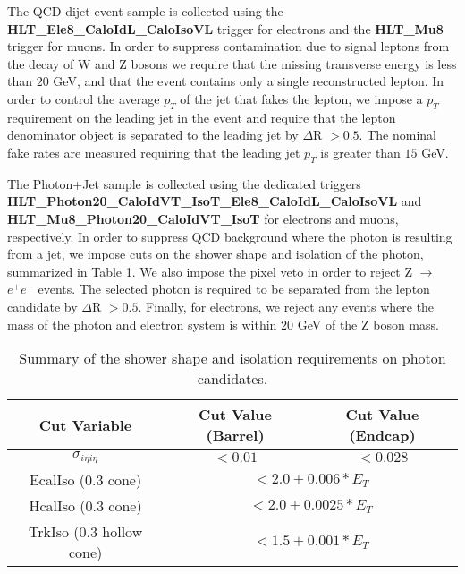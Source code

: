 The QCD dijet event sample is collected using the {\bf HLT\_Ele8\_CaloIdL\_CaloIsoVL } 
trigger for electrons and the {\bf HLT\_Mu8 } trigger for muons. In order to suppress 
contamination due to signal leptons from the decay of W and Z bosons we require
that the missing transverse energy is less than $20$ GeV, and that the event contains 
only a single reconstructed lepton. In order to control the average $p_{T}$ of the
jet that fakes the lepton, we impose a $p_{T}$ requirement on the leading jet
in the event and require that the lepton denominator object is 
separated to the leading jet by $\Delta$R $ > 0.5$. The nominal fake rates are measured
requiring that the leading jet $p_{T}$ is greater than $15$ GeV. 

The Photon+Jet sample is collected using the dedicated triggers \\
{\bf HLT\_Photon20\_CaloIdVT\_IsoT\_Ele8\_CaloIdL\_CaloIsoVL} and 
{\bf HLT\_Mu8\_Photon20\_CaloIdVT\_IsoT} for electrons and muons, respectively.
In order to suppress QCD background where the photon is resulting from a 
jet, we impose cuts on the shower shape and isolation of the photon, 
summarized in Table \ref{tab:photonOfflineSelection}. We also impose the pixel veto in order to reject
Z $\rightarrow$ $e^{+}e^{-}$ events. The selected photon is required to
be separated from the lepton candidate by $\Delta$R $ > 0.5$. Finally, 
for electrons, we reject any events where the mass of the photon and
electron system is within $20$ GeV of the Z boson mass. 


\begin{table}[!ht]
\begin{center}
\begin{tabular}{|c|c|c|}
\hline
 Cut Variable           &   Cut Value (Barrel)        & Cut Value (Endcap)     \\
\hline
 $\sigma_{i\eta i\eta}$      &   $<0.01$              & $<0.028$               \\ 
\hline
 EcalIso (0.3 cone)          &   \multicolumn{2}{|c|}{$<2.0 + 0.006*E_{T}$}    \\ 
 HcalIso (0.3 cone)          &   \multicolumn{2}{|c|}{$<2.0 + 0.0025*E_{T}$}   \\ 
 TrkIso (0.3 hollow cone)    &   \multicolumn{2}{|c|}{$<1.5 + 0.001*E_{T}$}    \\ 
\hline
\end{tabular}
\caption{Summary of the shower shape and isolation requirements on 
photon candidates. \label{tab:photonOfflineSelection}}
\end{center}
\end{table}



